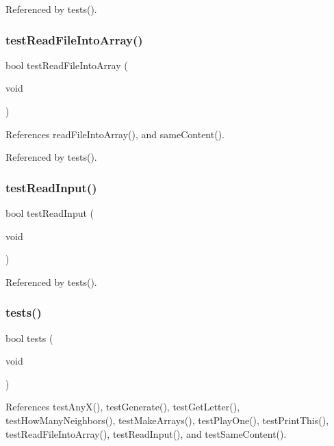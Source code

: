 Referenced by tests().

\mbox{\label{tests_8c_ae12ec7cb088bc82987c1d1e229d56a2d}} 
\subsubsection{test\+Read\+File\+Into\+Array()}
{\footnotesize\ttfamily bool test\+Read\+File\+Into\+Array (\begin{DoxyParamCaption}\item[{void}]{ }\end{DoxyParamCaption})}



References read\+File\+Into\+Array(), and same\+Content().



Referenced by tests().

\mbox{\label{tests_8c_aa89f64db87aebe77bd891e2894595e4e}} 
\subsubsection{test\+Read\+Input()}
{\footnotesize\ttfamily bool test\+Read\+Input (\begin{DoxyParamCaption}\item[{void}]{ }\end{DoxyParamCaption})}



Referenced by tests().

\mbox{\label{tests_8c_a5e6e6e78df62797046c9ea173550a68a}} 
\subsubsection{tests()}
{\footnotesize\ttfamily bool tests (\begin{DoxyParamCaption}\item[{void}]{ }\end{DoxyParamCaption})}



References test\+Any\+X(), test\+Generate(), test\+Get\+Letter(), test\+How\+Many\+Neighbors(), test\+Make\+Arrays(), test\+Play\+One(), test\+Print\+This(), test\+Read\+File\+Into\+Array(), test\+Read\+Input(), and test\+Same\+Content().



